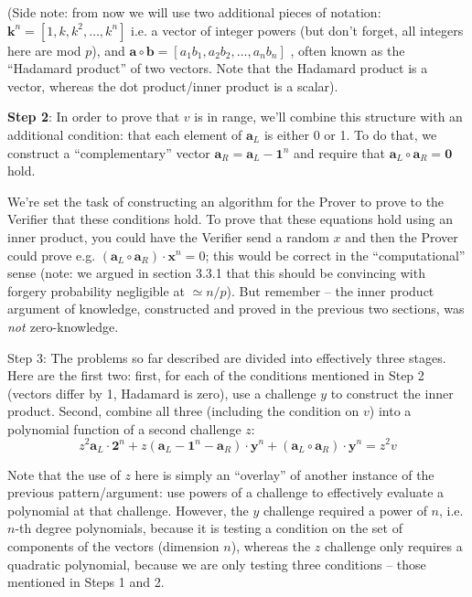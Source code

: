 \documentclass[10pt,a4paper]{article}
\begin{document}
(Side note: from now we will use two additional pieces of notation: $\textbf{k}^{n} = [1, k, k^2, \ldots,k^n]$ i.e.
a vector of integer powers (but don't forget, all integers here are mod
$p$), and $\textbf{a} \circ \textbf{b} = [a_1b_1, a_2b_2, \ldots, a_nb_n]$ , often known as the ``Hadamard product'' of two vectors. Note
that the Hadamard product is a vector, whereas the dot product/inner
product is a scalar).

\textbf{Step 2}: In order to prove that $v$ is in range, we'll combine this
structure with an additional condition: that each element of $\mathbf{a}_L$ is either 0
or 1. To do that, we construct a ``complementary'' vector $\textbf{a}_R = \textbf{a}_L - \textbf{1}^n$ and require
that $\textbf{a}_L \circ \textbf{a}_R = \textbf{0}$ hold.

We're set the task of constructing an algorithm for the Prover to prove
to the Verifier that these conditions hold. To prove that these
equations hold using an inner product, you could have the Verifier send
a random $x$ and then the Prover could prove e.g. $(\textbf{a}_L \circ \textbf{a}_R) \cdot \textbf{x}^n = 0$; this would be correct in
the ``computational'' sense (note: we argued in section 3.3.1 that this
should be convincing with forgery probability negligible at $\simeq n/p$). But
remember -- the inner product argument of knowledge, constructed and
proved in the previous two sections, was \emph{not\textbf{
}}zero-knowledge.

Step 3: The problems so far described are divided into effectively three
stages. Here are the first two: first, for each of the conditions
mentioned in Step 2 (vectors differ by 1, Hadamard is zero), use a
challenge $y$ to construct the inner product. Second, combine all three
(including the condition on $v$) into a polynomial function of a second
challenge $z$:
\[z^2 \textbf{a}_L \cdot \textbf{2}^n + z\left(\textbf{a}_L - \textbf{1}^n - \textbf{a}_R\right) \cdot \textbf{y}^n + (\textbf{a}_L \circ \textbf{a}_R) \cdot \textbf{y}^n = z^2 v\]

Note that the use of $z$ here is simply an ``overlay'' of another instance
of the previous pattern/argument: use powers of a challenge to
effectively evaluate a polynomial at that challenge. However, the $y$
challenge required a power of $n$, i.e. $n$-th degree polynomials, because it
is testing a condition on the set of components of the vectors
(dimension $n$), whereas the $z$ challenge only requires a quadratic
polynomial, because we are only testing three conditions -- those
mentioned in Steps 1 and 2.
\end{document}
